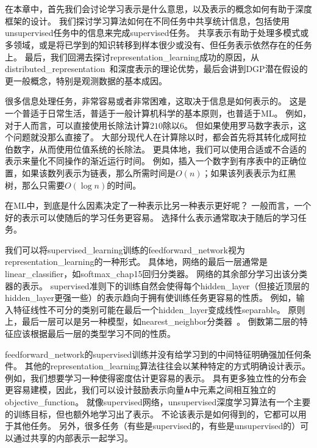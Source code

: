 \chapter{}
\label{chap:representation_learning}
在本章中，首先我们会讨论学习表示是什么意思，以及表示的概念如何有助于深度框架的设计。
我们探讨学习算法如何在不同任务中共享统计信息，包括使用\gls{unsupervised}任务中的信息来完成\gls{supervised}任务。
共享表示有助于处理多模式或多领域，或是将已学到的知识转移到样本很少或没有、但任务表示依然存在的任务上。
最后，我们回溯去探讨\gls{representation_learning}成功的原因，从\gls{distributed_representation}~\citep{Hinton-et-al-PDP1986}和深度表示的理论优势，最后会讲到\gls{DGP}潜在假设的更一般概念，特别是观测数据的基本成因。


很多信息处理任务，非常容易或者非常困难，这取决于信息是如何表示的。
这是一个普适于日常生活，普适于一般计算机科学的基本原则，也普适于\gls{ML}。
例如，对于人而言，可以直接使用长除法计算$210$除以$6$。
但如果使用罗马数字表示，这个问题就没那么直接了。
大部分现代人在计算除以时，都会首先将其转化成阿拉伯数字，从而使用位值系统的长除法。
更具体地，我们可以使用合适或不合适的表示来量化不同操作的渐近运行时间。
例如，插入一个数字到有序表中的正确位置，如果该数列表示为链表，那么所需时间是$O(n)$；如果该列表表示为红黑树，那么只需要$O(\log n)$的时间。


在\gls{ML}中，到底是什么因素决定了一种表示比另一种表示更好呢？
一般而言，一个好的表示可以使随后的学习任务更容易。
选择什么表示通常取决于随后的学习任务。


我们可以将\gls{supervised_learning}训练的\gls{feedforward_network}视为\gls{representation_learning}的一种形式。
具体地，网络的最后一层通常是\gls{linear_classifier}，如\gls{softmax_chap15}回归分类器。
网络的其余部分学习出该分类器的表示。
\gls{supervised}准则下的训练自然会使得每个\gls{hidden_layer}（但接近顶层的\gls{hidden_layer}更强一些）的表示趋向于拥有使训练任务更容易的性质。
例如，输入特征线性不可分的类别可能在最后一个\gls{hidden_layer}变成线性\gls{separable}。
原则上，最后一层可以是另一种模型，如\gls{nearest_neighbor}分类器~\citep{SalakhutdinovR2007-small}。
倒数第二层的特征应该根据最后一层的类型学习不同的性质。


\gls{feedforward_network}的\gls{supervised}训练并没有给学习到的中间特征明确强加任何条件。
其他的\gls{representation_learning}算法往往会以某种特定的方式明确设计表示。
例如，我们想要学习一种使得密度估计更容易的表示。
具有更多独立性的分布会更容易建模，因此，我们可以设计鼓励表示向量$\boldsymbol{\mathit{h}}$中元素之间相互独立的\gls{objective_function}。
就像\gls{supervised}网络，\gls{unsupervised}深度学习算法有一个主要的训练目标，但也额外地学习出了表示。
不论该表示是如何得到的，它都可以用于其他任务。
另外，很多任务（有些是\gls{supervised}的，有些是\gls{unsupervised}的）可以通过共享的内部表示一起学习。


